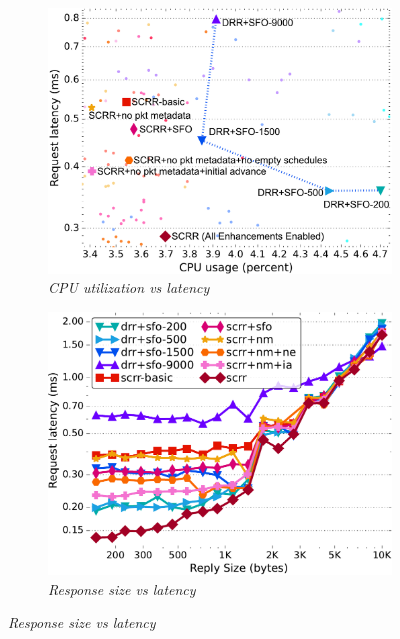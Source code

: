 \begin{figure}[t]
  \centering	
  \begin{subfigure}[t]{.45\linewidth}
    \centering
    \includegraphics[width=1\linewidth]{figs/component3.pdf}
    \caption{\small{\textit{CPU utilization vs latency}}}
    \label{fig:component-cpu-lat}
  \end{subfigure}
  \begin{subfigure}[t]{.45\linewidth}
    \centering
    \includegraphics[width=1\linewidth]{figs/component1.pdf}
    \caption{\small{\textit{Response size vs latency}}}

\end{subfigure}
\end{figure}
